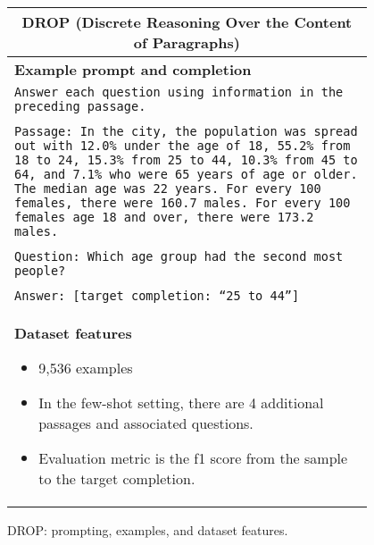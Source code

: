 \begin{figure}[p]
    \centering
    \small
    \begin{tabular}{p{0.95\linewidth}}
    \toprule
    \multicolumn{1}{c}{\textbf{DROP (Discrete Reasoning Over the Content of Paragraphs)}} \\
    \midrule
    \textbf{Example prompt and completion}  \\
    \texttt{Answer each question using information in the preceding passage.}  \\\\
    \texttt{Passage: In the city, the population was spread out with 12.0\% under the age of 18, 55.2\% from 18 to 24, 15.3\% from 25 to 44, 10.3\% from 45 to 64, and 7.1\% who were 65 years of age or older. The median age was 22 years. For every 100 females, there were 160.7 males. For every 100 females age 18 and over, there were 173.2 males.}  \\\\
    \texttt{Question: Which age group had the second most people?}  \\\\
    \texttt{Answer: [target completion: ``25 to 44'']}  \\

    \midrule
    \textbf{Dataset features}
    \begin{itemize}
        \item 9,536 examples
        \item In the few-shot setting, there are 4 additional passages and associated questions.
        \item Evaluation metric is the f1 score from the sample to the target completion.
    \end{itemize} \\

    \bottomrule
    \end{tabular}
    \caption{DROP: prompting, examples, and dataset features.}
    \label{tab:prompt-drop}
\end{figure}

